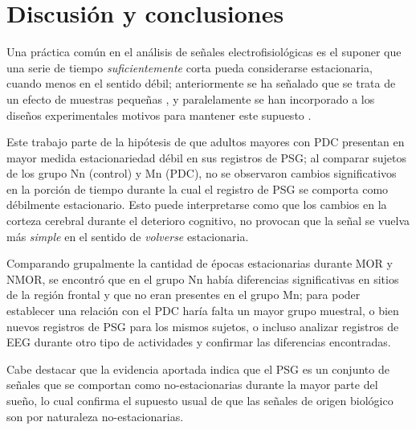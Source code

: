 
\chapter{Discusión y conclusiones}

Una práctica común en el análisis de señales electrofisiológicas es el suponer que una serie de 
tiempo \textit{suficientemente} corta pueda considerarse estacionaria, cuando menos en el sentido
débil; anteriormente se ha señalado que se trata de un efecto de muestras pequeñas \cite{Melard89},
y paralelamente se han incorporado a los diseños experimentales motivos para mantener este supuesto
\cite{Kaiser00}.

Este trabajo parte de la hipótesis de que adultos mayores con PDC presentan en mayor medida 
estacionariedad débil en sus registros de PSG; al comparar sujetos de los grupo Nn (control) y Mn 
(PDC), no se observaron cambios significativos en la porción de tiempo durante la cual el registro 
de PSG se comporta como débilmente estacionario. 
Esto puede interpretarse como que los cambios en la corteza cerebral durante el deterioro 
cognitivo, no provocan que  la señal se vuelva más \textit{simple} en el sentido de 
\textit{volverse} estacionaria.

Comparando grupalmente la cantidad de épocas estacionarias durante MOR y NMOR, se encontró que en 
el grupo Nn había diferencias significativas en sitios de la región frontal y que no eran presentes
en el grupo Mn; para poder establecer una relación con el PDC haría falta un mayor grupo muestral, 
o bien nuevos registros de PSG para los mismos sujetos, o incluso analizar registros de EEG durante 
otro tipo de actividades y confirmar las diferencias encontradas.

Cabe destacar que la evidencia aportada indica que el PSG es un conjunto de señales que se comportan
como no-estacionarias durante la mayor parte del sueño, lo cual confirma el supuesto usual de que 
las señales de origen biológico son por naturaleza no-estacionarias. 

